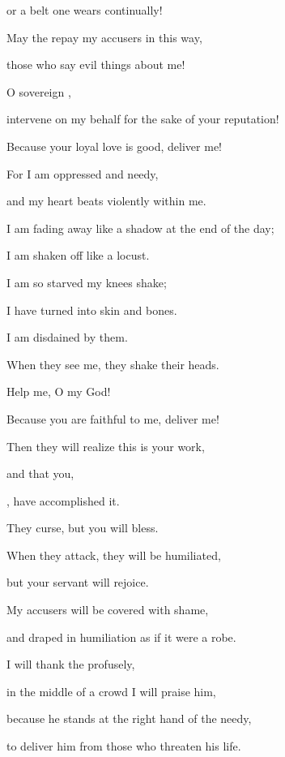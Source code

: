 {\par }{\Q or a belt
one wears
continually!
\par }{\Q {}May the
{}
repay
my accusers
in this
way,
\par }{\Q those who say
evil
things about me!
\par }{\Q {}O sovereign
{},

\par }{\Q intervene
on my behalf
for the sake
of your reputation!

\par }{\Q Because
your loyal love
is good,
deliver me!
\par }{\Q {}For
I am
oppressed
and needy,
\par }{\Q and my heart
beats
violently within me.
\par }{\Q {}I am fading
away
like a shadow
at the end of the day;

\par }{\Q I am shaken
off like a locust.
\par }{\Q {}I am so starved
my knees
shake;
\par }{\Q I
have turned into skin and bones.
\par }{\Q {}I am
disdained
by them.
\par }{\Q When they
see
me, they shake
their heads.
\par }{\Q {}Help
me, O
{}
my God!
\par }{\Q Because you are faithful
to me, deliver me!
\par }{\Q {}Then they will realize
this
is your work,

\par }{\Q and that you,

{}, have accomplished it.
\par }{\Q {}They curse,
but you
will bless.
\par }{\Q When they attack,
they will be humiliated,
\par }{\Q but your servant
will rejoice.
\par }{\Q {}My accusers
will be covered
with shame,
\par }{\Q and draped
in humiliation
as if it were
a robe.
\par }{\Q {}I will thank
the {}
profusely,
\par }{\Q in the middle
of a crowd
I will praise him,
\par }{\Q {}because
he stands
at the right hand
of the needy,
\par }{\Q to deliver
him from those who threaten
his life.


}

